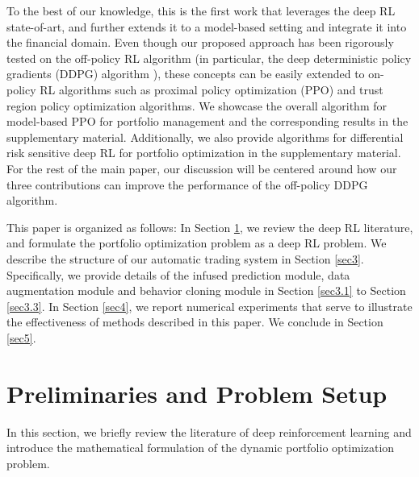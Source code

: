 \documentclass{article}
\begin{document}
To the best of our knowledge, this is the first work that leverages the deep RL state-of-art, and further extends it to a model-based setting and integrate it into the financial domain. Even though our proposed approach has been {rigorously} tested on the off-policy RL algorithm (in particular, the deep deterministic policy gradients (DDPG) algorithm \cite{lillicrap2015continuous}), these concepts can be easily extended to on-policy RL algorithms such as proximal policy optimization (PPO) \cite{schulman2017proximal} and trust region policy optimization \cite{schulman2015trust} algorithms. {We showcase the overall algorithm for model-based PPO for portfolio management and the corresponding results in the supplementary material.} Additionally, we also provide algorithms for differential risk sensitive deep RL for portfolio optimization in the supplementary material. For the rest of the main paper, our discussion will be centered around how our three contributions can improve the performance of the off-policy DDPG algorithm.

This paper is organized as follows: In Section \ref{sec2}, we review the deep RL literature, and formulate the portfolio {optimization} problem as a deep RL problem. We describe the structure of our automatic trading system in Section \ref{sec3}. Specifically, we provide details of the infused prediction module, data augmentation module and behavior cloning module in Section \ref{sec3.1} to Section \ref{sec3.3}. In Section \ref{sec4}, we report numerical experiments that serve to illustrate the {effectiveness of} methods described in this paper.  We conclude in Section \ref{sec5}. %

\section{Preliminaries and Problem Setup}\label{sec2}
In this section, we briefly review the literature of deep reinforcement learning and introduce the mathematical formulation of the dynamic portfolio optimization problem.
\end{document}
